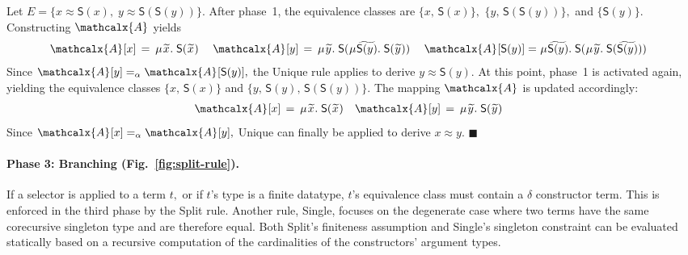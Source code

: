\documentclass[smallcondensed,draft]{svjour3}
\newcommand\MU{\vvthinspace\mu\vvthinspace}
\newcommand\const[1]{\textsf{#1}}
\newcommand\xend{{\hfill$\scriptstyle\blacksquare$}}
\newcommand{\Ec}{E}
\newcommand{\tEc}{\Terms(\Ec)}
\newcommand{\rn}[1]{\textsf{#1}}
\newcommand{\teq}{\approx}
\newcommand{\ec}[1]{[#1]}
\newcommand{\Val}{\mathcalx{A}\vvthinspace}
\newcommand{\Varec}[1]{\vvthinspace\widetilde{#1}\vvthinspace}
\newcommand{\VAREC}[1]{\widetilde{\vphantom{\scriptstyle x^i}\smash{#1}}}
\newcommand{\aequiv}{\mathrel{=_\alpha}}
\newcommand\Terms{\mathcalx{T}}
\newcommand\vvthinspace{\kern+0.041667em}
\begin{document}

\begin{examplex}
Let $\Ec = \{ x \teq \const{S}(x),\; y \teq \const{S}(\const{S}(y)) \}.$
After phase~1, the equivalence classes %
are
$\{ x,\, \const{S}(x) \},$
$\{ y,\, \const{S}(\const{S}(y)) \},$
and $\{ \const{S}(y) \}.$
Constructing $\Val$ yields
\begin{align*}
\Val \ec{x} & \,=\, \MU {\Varec{x}}.\; \const{S}(\Varec{x}) &
\kern0.25em %
\Val \ec{y} & \,=\,
\MU {\Varec{y}}.\; \const{S}(\smash{\MU {\VAREC{\const{S}(y)}}}.\; \const{S}( {\Varec{y}} ) )
\kern0.25em %
 &
\Val \ec{\const{S}(y)} & =
\MU {\VAREC{\const{S}(y)}}.\; \const{S}(\MU {\Varec{y}}.\; \const{S}( {\VAREC{\const{S}(y)}} ) )
\end{align*}
Since $\Val \ec{y} \aequiv \Val \ec{\const{S}(y)},$
the \rn{Unique} rule applies to derive $y \teq \const{S}(y).$
%
At this point, phase~1 is activated again, %
yielding the equivalence classes
$\{ x,\, \const{S}(x) \}$ and
$\{ y,\, \const{S}(y),\allowbreak\, \const{S}(\const{S}(y)) \}.$
The mapping $\Val$ is updated accordingly:
\begin{align*}
\Val \ec{x} & \,=\, \MU {\Varec{x}}.\; \const{S}(\Varec{x})
&
\Val \ec{y} & \,=\, \MU {\Varec{y}}.\; \const{S}({\Varec{y}})
\end{align*}
Since $\Val \ec{x} \aequiv \Val \ec{y},$
\rn{Unique} can finally be applied to derive $x \teq y.$
\xend
\end{examplex}

\paragraph{Phase 3: Branching \rm(Fig.~\ref{fig:split-rule}).}
If a selector is applied to a term $t,$ or if $t$'s type is a finite datatype,
$t$'s equivalence class must contain a
$\delta$ constructor term.
This is enforced in the third phase by the \rn{Split} rule.
Another rule, \rn{Single}, focuses on the degenerate case where two
terms %
have the same corecursive singleton type
and are therefore equal. Both
\rn{Split}'s finiteness assumption %
and \rn{Single}'s singleton
constraint %
can be evaluated statically
based on a recursive computation of the cardinalities of the
constructors' argument types.
\end{document}

